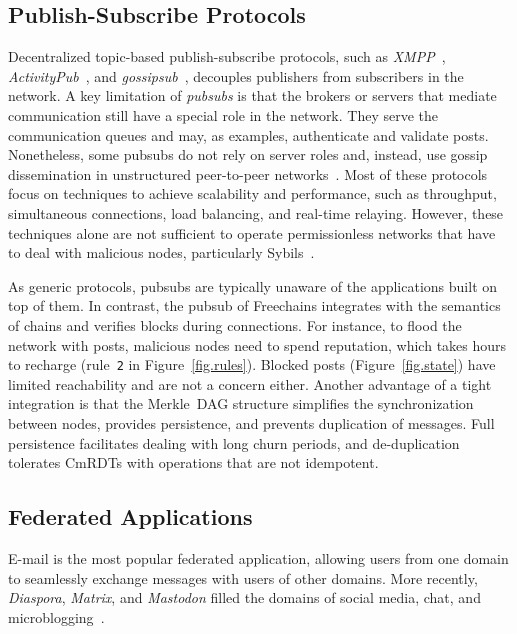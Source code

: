 \documentclass[10pt,journal,compsoc]{IEEEtran}
\newcommand{\FC}       {Freechains\xspace}
\begin{document}
\subsection{Publish-Subscribe Protocols}

Decentralized topic-based publish-subscribe protocols, such as
    \emph{XMPP}~\cite{pubsub.xmpp},
    \emph{ActivityPub}~\cite{pubsub.activitypub}, and
    \emph{gossipsub}~\cite{pubsub.gossipsub},
decouples publishers from subscribers in the network.
%
A key limitation of \emph{pubsubs} is that the brokers or servers that mediate
communication still have a special role in the network.
They serve the communication queues and may, as examples, authenticate and
validate posts.
%
Nonetheless, some pubsubs do not rely on server roles and, instead, use gossip
dissemination in unstructured peer-to-peer networks~\cite{pubsub.tera,pubsub.rappel,pubsub.stan,pubsub.vitis,pubsub.gossipsub,pubsub.rappel}.
Most of these protocols focus on techniques to achieve scalability and
performance, such as throughput, simultaneous connections, load balancing, and
real-time relaying.
However, these techniques alone are not sufficient to operate permissionless
networks that have to deal with malicious nodes, particularly
Sybils~\cite{pubsub.gossipsub2}.

As generic protocols, pubsubs are typically unaware of the applications built
on top of them.
In contrast, the pubsub of \FC integrates with the semantics of chains and
verifies blocks during connections.
For instance, to flood the network with posts, malicious nodes need to spend
reputation, which takes hours to recharge (rule~\texttt{2} in
Figure~\ref{fig.rules}).
Blocked posts (Figure~\ref{fig.state}) have limited reachability and are not a
concern either.
Another advantage of a tight integration is that the Merkle~DAG structure
simplifies the synchronization between nodes, provides persistence, and
prevents duplication of messages.
Full persistence facilitates dealing with long churn periods, and
de-duplication tolerates CmRDTs with operations that are not idempotent.

\subsection{Federated Applications}

E-mail is the most popular federated application, allowing users from one
domain to seamlessly exchange messages with users of other domains.
More recently, \emph{Diaspora}, \emph{Matrix}, and \emph{Mastodon} filled the
domains of social media, chat, and microblogging~\cite{p2p.ecosystem}.
\end{document}
